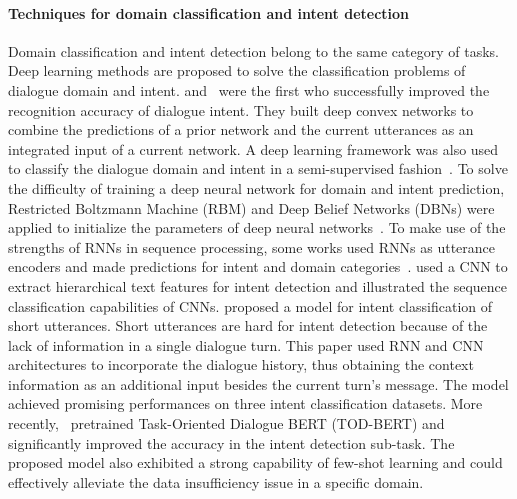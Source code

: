 \paragraph*{Techniques for domain classification and intent detection} Domain classification and intent detection belong to the same category of tasks. Deep learning methods are proposed to solve the classification problems of dialogue domain and intent.  and~ were the first who successfully improved the recognition accuracy of dialogue intent. They built deep convex networks to combine the predictions of a prior network and the current utterances as an integrated input of a current network. A deep learning framework was also used to classify the dialogue domain and intent in a semi-supervised fashion~. To solve the difficulty of training a deep neural network for domain and intent prediction, Restricted Boltzmann Machine (RBM) and Deep Belief Networks (DBNs) were applied to initialize the parameters of deep neural networks~. To make use of the strengths of RNNs in sequence processing, some works used RNNs as utterance encoders and made predictions for intent and domain categories~.  used a CNN to extract hierarchical text features for intent detection and illustrated the sequence classification capabilities of CNNs.  proposed a model for intent classification of short utterances. Short utterances are hard for intent detection because of the lack of information in a single dialogue turn. This paper used RNN and CNN architectures to incorporate the dialogue history, thus obtaining the context information as an additional input besides the current turn's message. The model achieved promising performances on three intent classification datasets. More recently,~ pretrained Task-Oriented Dialogue BERT (TOD-BERT) and significantly improved the accuracy in the intent detection sub-task. The proposed model also exhibited a strong capability of few-shot learning and could effectively alleviate the data insufficiency issue in a specific domain. 
